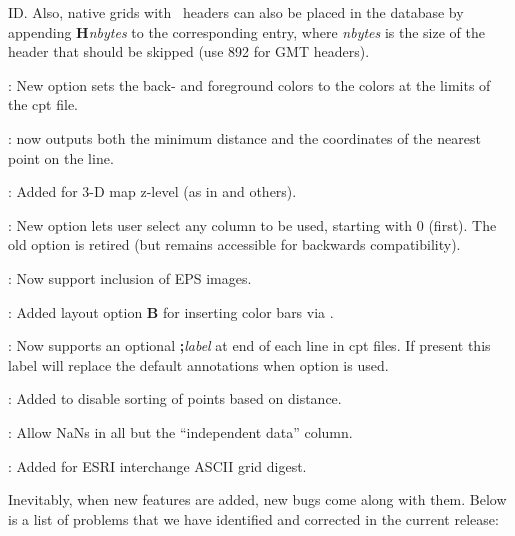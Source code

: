 \begin{description}
ID.  Also, native grids with \GMT\ headers can also be placed in the database by appending {\bf H}{\it nbytes} to the
corresponding  entry, where {\it nbytes} is the size of the header that should be skipped
(use 892 for GMT headers).
\item [\GMTprog{makecpt}]: New option  sets the back- and foreground colors to the colors at the limits of the cpt file.
\item [\GMTprog{mapproject}]:  now outputs both the minimum distance and the coordinates
of the nearest point on the line.
\item [\GMTprog{pscoast}]: Added  for 3-D map z-level (as in  and others).
\item [\GMTprog{pshistogram}]: New option  lets user select any column to be used, starting
with 0 (first).  The old  option is retired (but remains accessible for backwards compatibility).  
\item [\GMTprog{psimage}]: Now support inclusion of EPS images.
\item [\GMTprog{pslegend}]: Added layout option {\bf B} for inserting color bars via .
\item [\GMTprog{psscale}]: Now supports an optional {\bf ;}{\it label} at end of each line in cpt files.
If present this label will replace the default annotations when option  is used.
\item [\GMTprog{psxyz}]: Added  to disable sorting of points based on distance.
\item [\GMTprog{sample1d}]: Allow NaNs in all but the ``independent data'' column.
\item [\GMTprog{xyz2grd}]: Added  for ESRI interchange ASCII grid digest.
\end{description}

Inevitably, when new features are added, new bugs come along with them.  Below is a list of problems
that we have identified and corrected in the current release:

